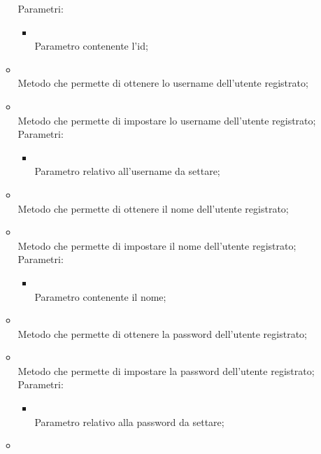 \begin{itemize}
\begin{itemize}
		Parametri:
		\begin{itemize}
			\item {} \\
			Parametro contenente l'id;
		\end{itemize}
		\item[]  \\
		Metodo che permette di ottenere lo username dell'utente registrato;\\
		\item[]  \\
		Metodo che permette di impostare lo username dell'utente registrato;\\
		Parametri:
		\begin{itemize}
			\item {} \\
			Parametro relativo all'username da settare;
		\end{itemize}
		\item[]  \\
		Metodo che permette di ottenere il nome dell'utente registrato;\\
		\item[]  \\
		Metodo che permette di impostare il nome dell'utente registrato;\\
		Parametri:
		\begin{itemize}
			\item {} \\
			Parametro contenente il nome;
		\end{itemize}
		\item[]  \\
		Metodo che permette di ottenere la password dell'utente registrato;\\
		\item[]  \\
		Metodo che permette di impostare la password dell'utente registrato;\\
		Parametri:
		\begin{itemize}
			\item {} \\
			Parametro relativo alla password da settare;
		\end{itemize}
		\item[]  \\

\end{itemize}
\end{itemize}
